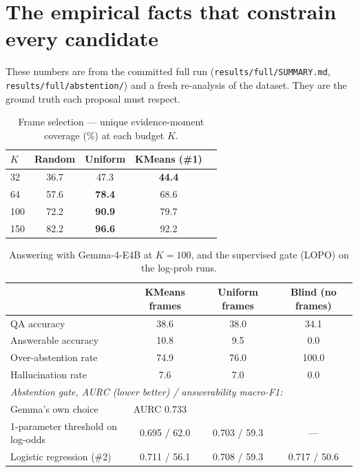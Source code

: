 \documentclass[11pt]{article}
\newcommand{\code}[1]{\texttt{#1}}
\begin{document}
\section{The empirical facts that constrain every candidate}
These numbers are from the committed full run (\code{results/full/SUMMARY.md}, \code{results/full/abstention/}) and a fresh re-analysis of the dataset. They are the ground truth each proposal must respect.

\begin{table}[h]\centering\small
\caption{Frame selection --- unique evidence-moment coverage (\%) at each budget $K$.}
\begin{tabular}{lcccc}
\toprule
$K$ & Random & Uniform & KMeans (\#1) \\
\midrule
32  & 36.7 & 47.3 & \textbf{44.4} \\
64  & 57.6 & \textbf{78.4} & 68.6 \\
100 & 72.2 & \textbf{90.9} & 79.7 \\
150 & 82.2 & \textbf{96.6} & 92.2 \\
\bottomrule
\end{tabular}
\end{table}

\begin{table}[h]\centering\small
\caption{Answering with Gemma-4-E4B at $K{=}100$, and the supervised gate (LOPO) on the log-prob runs.}
\begin{tabular}{lccc}
\toprule
 & KMeans frames & Uniform frames & Blind (no frames) \\
\midrule
QA accuracy & 38.6 & 38.0 & 34.1 \\
Answerable accuracy & 10.8 & 9.5 & 0.0 \\
Over-abstention rate & 74.9 & 76.0 & 100.0 \\
Hallucination rate & 7.6 & 7.0 & 0.0 \\
\midrule
\multicolumn{4}{l}{\emph{Abstention gate, AURC (lower better) / answerability macro-F1:}}\\
Gemma's own choice & \multicolumn{3}{l}{AURC 0.733} \\
1-parameter threshold on log-odds & 0.695 / 62.0 & 0.703 / 59.3 & --- \\
Logistic regression (\#2) & 0.711 / 56.1 & 0.708 / 59.3 & 0.717 / 50.6 \\
\bottomrule
\end{tabular}
\end{table}
\end{document}
